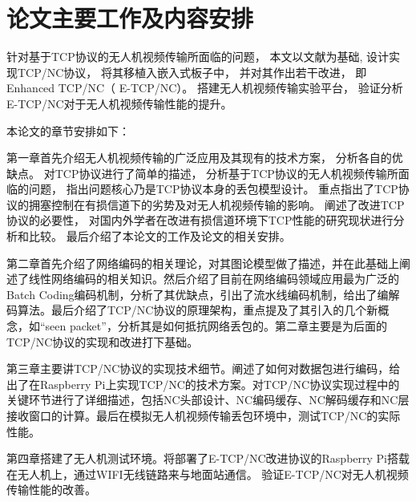 \section{论文主要工作及内容安排}
针对基于TCP协议的无人机视频传输所面临的问题，
本文以文献\cite{Sundararajan2009}为基础,
设计实现TCP/NC协议，
将其移植入嵌入式板子中，
并对其作出若干改进，
即Enhanced TCP/NC（ E-TCP/NC）。
搭建无人机视频传输实验平台，
验证分析E-TCP/NC对于无人机视频传输性能的提升。
\par
本论文的章节安排如下：
\par
第一章首先介绍无人机视频传输的广泛应用及其现有的技术方案，
分析各自的优缺点。
对TCP协议进行了简单的描述，
分析基于TCP协议的无人机视频传输所面临的问题，
指出问题核心乃是TCP协议本身的丢包模型设计。
重点指出了TCP协议的拥塞控制在有损信道下的劣势及对无人机视频传输的影响。
阐述了改进TCP协议的必要性，
对国内外学者在改进有损信道环境下TCP性能的研究现状进行分析和比较。
最后介绍了本论文的工作及论文的相关安排。
\par
第二章首先介绍了网络编码的相关理论，对其图论模型做了描述，并在此基础上阐述了线性网络编码的相关知识。然后介绍了目前在网络编码领域应用最为广泛的Batch Coding编码机制，分析了其优缺点，引出了流水线编码机制，给出了编解码算法。最后介绍了TCP/NC协议的原理架构，重点提及了其引入的几个新概念，如“seen packet”，分析其是如何抵抗网络丢包的。第二章主要是为后面的TCP/NC协议的实现和改进打下基础。 
\par
第三章主要讲TCP/NC协议的实现技术细节。阐述了如何对数据包进行编码，给出了在Raspberry Pi上实现TCP/NC的技术方案。对TCP/NC协议实现过程中的关键环节进行了详细描述，包括NC头部设计、NC编码缓存、NC解码缓存和NC层接收窗口的计算。最后在模拟无人机视频传输丢包环境中，测试TCP/NC的实际性能。
\par
第四章搭建了无人机测试环境。将部署了E-TCP/NC改进协议的Raspberry Pi搭载在无人机上，通过WIFI无线链路来与地面站通信。 验证E-TCP/NC对无人机视频传输性能的改善。

